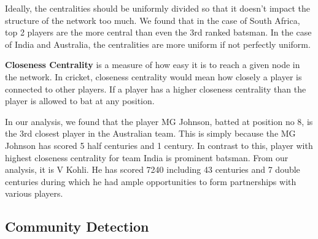 \documentclass{article}
\begin{document}
Ideally, the centralities should be uniformly divided so that it doesn't impact the structure of the network too much. We found that in the case of South Africa, top 2 players are the more central than even the 3rd ranked batsman. In the case of India and Australia, the centralities are more uniform if not perfectly uniform.

\noindent \textbf{Closeness Centrality} is a measure of how easy it is to reach a given node in the network. In cricket, closeness centrality would mean how closely a player is connected to other players. If a player has a higher closeness centrality than the player is allowed to bat at any position. 

In our analysis, we found that the player MG Johnson, batted at position no 8, is the 3rd closest player in the Australian team. This is simply because the MG Johnson has scored 5 half centuries and 1 century. In contrast to this, player with highest closeness centrality for team India is prominent batsman. From our analysis, it is V Kohli. He has scored 7240 including 43 centuries and 7 double centuries during which he had ample opportunities to form partnerships with various players.

\subsection{Community Detection}
\end{document}
